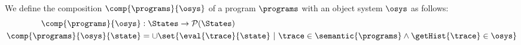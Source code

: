 We define the composition $\comp{\programs}{\osys}$ of a program 
$\programs$ with 
an object system $\osys$ as follows:
\begin{align*}
\comp{\programs}{\osys} &: \States \rightarrow \mathcal{P}(\States)\\
\comp{\programs}{\osys}{\state} &=
 \cup \set{\eval{\trace}{\state}\ |\ \trace \in \semantic{\programs} \land
  \getHist{\trace} \in \osys}
\end{align*}